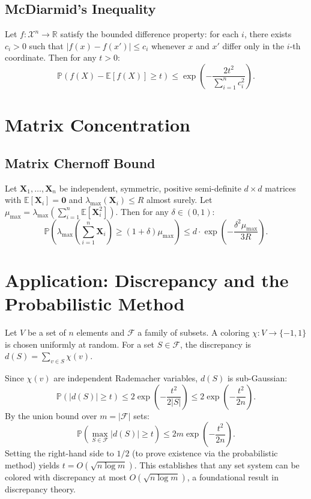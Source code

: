 \documentclass[11pt]{article}
\begin{document}
\subsection{McDiarmid's Inequality}
Let \(f: \mathcal{X}^n \to \mathbb{R}\) satisfy the bounded difference property: for each \(i\), there exists \(c_i > 0\) such that \(|f(x) - f(x')| \le c_i\) whenever \(x\) and \(x'\) differ only in the \(i\)-th coordinate. Then for any \(t > 0\):
\[
 \mathbb{P}(f(X) - \mathbb{E}[f(X)] \ge t) \le \exp\left( - \frac{2t^2}{\sum_{i=1}^n c_i^2} \right). 
\]

\hrulefill

\section{Matrix Concentration}

\subsection{Matrix Chernoff Bound}
Let \(\mathbf{X}_1, \dots, \mathbf{X}_n\) be independent, symmetric, positive semi-definite \(d \times d\) matrices with \(\mathbb{E}[\mathbf{X}_i] = \mathbf{0}\) and \(\lambda_{\max}(\mathbf{X}_i) \le R\) almost surely. Let \(\mu_{\max} = \lambda_{\max}\left(\sum_{i=1}^n \mathbb{E}[\mathbf{X}_i^2]\right)\). Then for any \(\delta \in (0,1)\):
\[
 \mathbb{P}\left( \lambda_{\max}\left( \sum_{i=1}^n \mathbf{X}_i \right) \ge (1+\delta)\mu_{\max} \right) \le d \cdot \exp\left( -\frac{\delta^2 \mu_{\max}}{3R} \right). 
\]

\hrulefill

\section{Application: Discrepancy and the Probabilistic Method}

Let \(V\) be a set of \(n\) elements and \(\mathcal{F}\) a family of subsets. A coloring \(\chi: V \to \{-1,1\}\) is chosen uniformly at random. For a set \(S \in \mathcal{F}\), the discrepancy is \(d(S) = \sum_{v \in S} \chi(v)\). 

Since \(\chi(v)\) are independent Rademacher variables, \(d(S)\) is sub-Gaussian:
\[
 \mathbb{P}(|d(S)| \ge t) \le 2\exp\left( -\frac{t^2}{2|S|} \right) \le 2\exp\left( -\frac{t^2}{2n} \right). 
\]
By the union bound over \(m = |\mathcal{F}|\) sets:
\[
 \mathbb{P}\left( \max_{S \in \mathcal{F}} |d(S)| \ge t \right) \le 2m \exp\left( -\frac{t^2}{2n} \right). 
\]
Setting the right-hand side to \(1/2\) (to prove existence via the probabilistic method) yields \(t = O(\sqrt{n \log m})\). This establishes that any set system can be colored with discrepancy at most \(O(\sqrt{n \log m})\), a foundational result in discrepancy theory.
\end{document}
